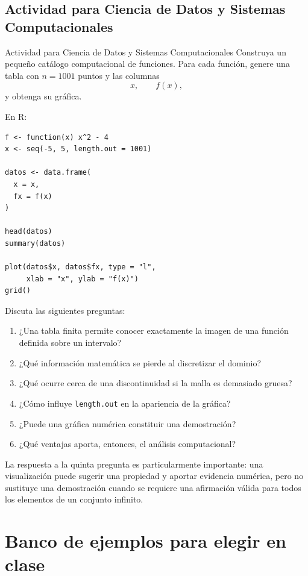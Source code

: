 \documentclass[aspectratio=169,10pt]{beamer}
\begin{document}
\subsection*{Actividad para Ciencia de Datos y Sistemas Computacionales}
\begin{frame}{Actividad para Ciencia de Datos y Sistemas Computacionales}
Construya un pequeño catálogo computacional de funciones. Para cada función,
genere una tabla con $n=1001$ puntos y las columnas
\[
x,\qquad f(x),
\]
y obtenga su gráfica.

En R:

\begin{verbatim}
f <- function(x) x^2 - 4
x <- seq(-5, 5, length.out = 1001)

datos <- data.frame(
  x = x,
  fx = f(x)
)

head(datos)
summary(datos)

plot(datos$x, datos$fx, type = "l",
     xlab = "x", ylab = "f(x)")
grid()
\end{verbatim}

Discuta las siguientes preguntas:

\begin{enumerate}
    \item ¿Una tabla finita permite conocer exactamente la imagen de una
    función definida sobre un intervalo?
    \item ¿Qué información matemática se pierde al discretizar el dominio?
    \item ¿Qué ocurre cerca de una discontinuidad si la malla es demasiado
    gruesa?
    \item ¿Cómo influye \texttt{length.out} en la apariencia de la gráfica?
    \item ¿Puede una gráfica numérica constituir una demostración?
    \item ¿Qué ventajas aporta, entonces, el análisis computacional?
\end{enumerate}

La respuesta a la quinta pregunta es particularmente importante: una
visualización puede sugerir una propiedad y aportar evidencia numérica, pero
no sustituye una demostración cuando se requiere una afirmación válida para
todos los elementos de un conjunto infinito.
\end{frame}
\section{Banco de ejemplos para elegir en clase}
\end{document}
